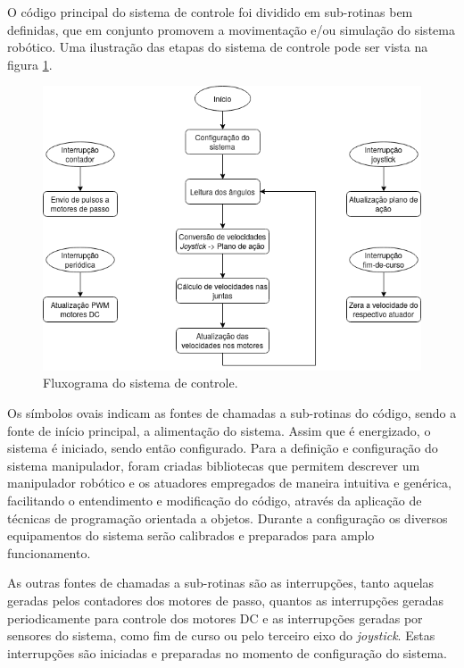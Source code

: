 O código principal do sistema de controle foi dividido em sub-rotinas bem definidas, que
em conjunto promovem a movimentação e/ou simulação do sistema robótico. Uma ilustração das
etapas do sistema de controle pode ser vista na figura \ref{fig:fluxograma}.

\begin{figure}[h]
    \caption{Fluxograma do sistema de controle.}

    \begin{centering}
        \includegraphics[width=0.7\columnwidth]{images/controle/fluxo.png} 
    \par\end{centering}

    \label{fig:fluxograma}
\end{figure}

Os símbolos ovais indicam as fontes de chamadas a sub-rotinas do código, sendo a fonte 
de início principal, a alimentação do sistema. Assim que é energizado, o sistema é iniciado, sendo
então configurado. Para a definição e configuração do sistema manipulador, foram criadas 
bibliotecas que permitem descrever um manipulador robótico e os atuadores empregados de maneira 
intuitiva e genérica, facilitando o entendimento e modificação do código, através da aplicação de 
técnicas de programação orientada a objetos. Durante a configuração os diversos equipamentos do sistema
serão calibrados e preparados para amplo funcionamento.

As outras fontes de chamadas a sub-rotinas são as interrupções, tanto aquelas geradas pelos contadores
dos motores de passo, quantos as interrupções geradas periodicamente para controle dos motores DC e 
as interrupções geradas por sensores do sistema, como fim de curso ou pelo terceiro eixo do \textit{joystick}. 
Estas interrupções são iniciadas e preparadas no momento de configuração do sistema.

